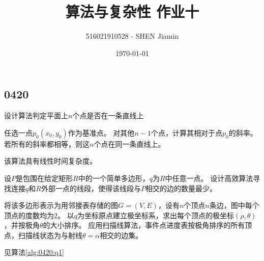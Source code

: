 \documentclass[answers]{exam}
\title{算法与复杂性 \quad 作业十}
\author{516021910528 - SHEN Jiamin}
\date{\today}
\begin{document}
\maketitle

\begin{questions}
    \section{0420}\label{sec:0420}

    \question 设计算法判定平面上$n$个点是否在一条直线上

    \begin{solution}
        任选一点$p_0(x_0,y_0)$作为基准点。
        对其他$n-1$个点，计算其相对于点$p_0$的斜率。
        若所有的斜率都相等，则这$n$个点在同一条直线上。

        该算法具有线性时间复杂度。
    \end{solution}

    \question 设$P$是包围在给定矩形$R$中的一个简单多边形，$q$为$R$中任意一点。
    设计高效算法寻找连接$q$和$R$外部一点的线段，使得该线段与$P$相交的边的数量最少。

    \begin{solution}
        将该多边形表示为用邻接表存储的图$G=(V,E)$，设有$n$个顶点$n$条边，图中每个顶点的度数均为$2$。
        以$q$为坐标原点建立极坐标系，求出每个顶点的极坐标$(\rho, \theta)$，并按极角$\theta$的大小排序。
        应用扫描线算法，事件点进度表按极角排序的所有顶点，扫描线状态为与射线$\theta = \alpha$相交的边集。

        见算法\ref{alg:0420:q1}
    \end{solution}


\end{questions}
\end{document}
